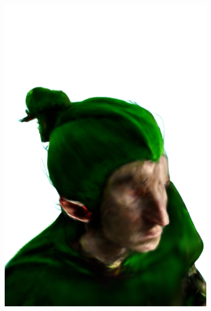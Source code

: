 \begin{figure}
\begin{subfigure}{0.18\linewidth}
        \includegraphics[width=\textwidth]{Figures/failed/igs2gs_1/15_render.png}
	\end{subfigure}
    \begin{subfigure}{0.18\linewidth}

\end{subfigure}
\end{figure}
